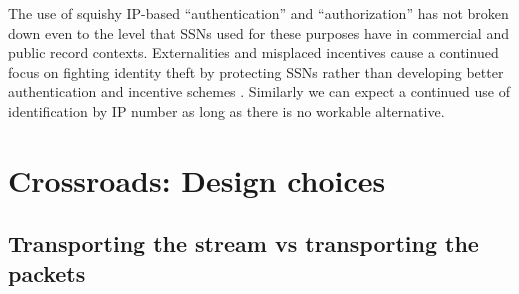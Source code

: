 \documentclass{llncs}
\newenvironment{tightlist}{\begin{list}{$\bullet$}{
  \setlength{\itemsep}{0mm}
    \setlength{\parsep}{0mm}
    }}{\end{list}}
\begin{document}

The use of squishy IP-based ``authentication'' and ``authorization''
has not broken down even to the level that SSNs used for these
purposes have in commercial and public record contexts. Externalities
and misplaced incentives cause a continued focus on fighting identity
theft by protecting SSNs rather than developing better authentication
and incentive schemes \cite{price-privacy}. Similarly we can expect a
continued use of identification by IP number as long as there is no
workable alternative.


\section{Crossroads: Design choices}
\label{sec:crossroads-design}

\subsection{Transporting the stream vs transporting the packets}
\label{subsec:stream-vs-packet}
\label{subsec:tcp-vs-ip}
\end{document}
